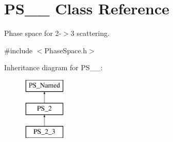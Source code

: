 \hypertarget{classPS__2__3}{}\section{P\+S\+\_\+\_ Class Reference}
\label{classPS__2__3}


Phase space for 2-\/$>$3 scattering.  




{\ttfamily \#include $<$Phase\+Space.\+h$>$}

Inheritance diagram for P\+S\+\_\+\_\+:\begin{figure}[H]
\begin{center}
\leavevmode
\includegraphics[height=3.000000cm]{classPS__2__3}
\end{center}
\end{figure}
